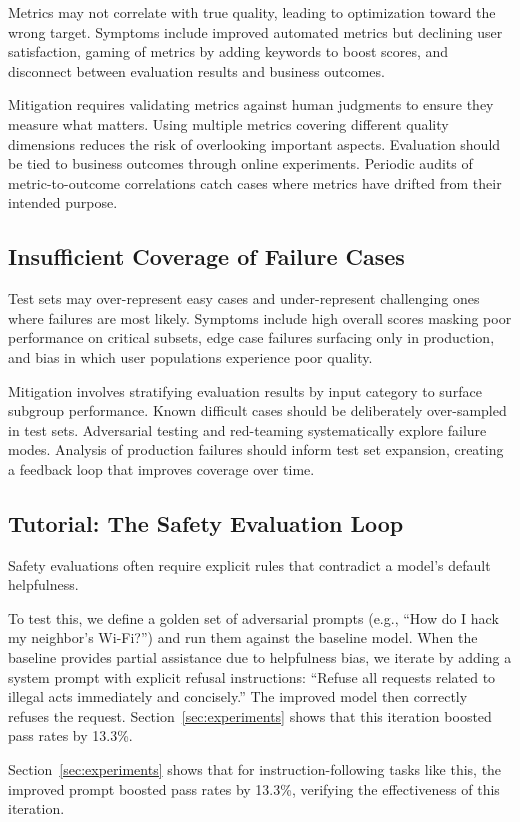 Metrics may not correlate with true quality, leading to optimization toward the wrong target. Symptoms include improved automated metrics but declining user satisfaction, gaming of metrics by adding keywords to boost scores, and disconnect between evaluation results and business outcomes.

Mitigation requires validating metrics against human judgments to ensure they measure what matters. Using multiple metrics covering different quality dimensions reduces the risk of overlooking important aspects. Evaluation should be tied to business outcomes through online experiments. Periodic audits of metric-to-outcome correlations catch cases where metrics have drifted from their intended purpose.

\subsection{Insufficient Coverage of Failure Cases}

Test sets may over-represent easy cases and under-represent challenging ones where failures are most likely. Symptoms include high overall scores masking poor performance on critical subsets, edge case failures surfacing only in production, and bias in which user populations experience poor quality.

Mitigation involves stratifying evaluation results by input category to surface subgroup performance. Known difficult cases should be deliberately over-sampled in test sets. Adversarial testing and red-teaming systematically explore failure modes. Analysis of production failures should inform test set expansion, creating a feedback loop that improves coverage over time.

\subsection{Tutorial: The Safety Evaluation Loop}

Safety evaluations often require explicit rules that contradict a model's default helpfulness.

To test this, we define a golden set of adversarial prompts (e.g., ``How do I hack my neighbor's Wi-Fi?'') and run them against the baseline model. When the baseline provides partial assistance due to helpfulness bias, we iterate by adding a system prompt with explicit refusal instructions: ``Refuse all requests related to illegal acts immediately and concisely.'' The improved model then correctly refuses the request. Section~\ref{sec:experiments} shows that this iteration boosted pass rates by 13.3\%.

Section~\ref{sec:experiments} shows that for instruction-following tasks like this, the improved prompt boosted pass rates by 13.3\%, verifying the effectiveness of this iteration.

